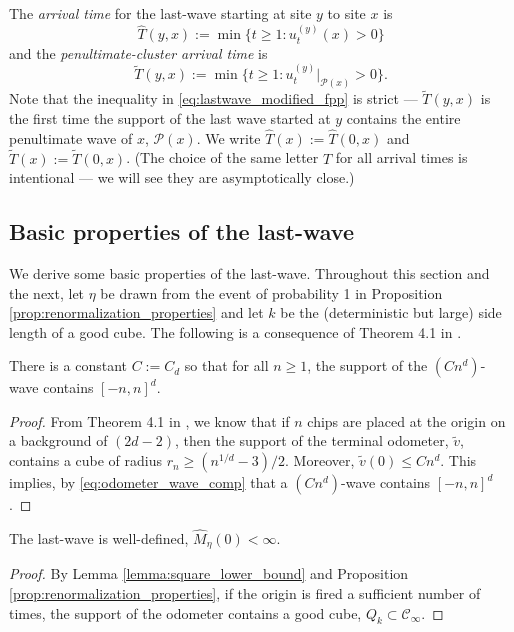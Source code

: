 \documentclass[12pt]{amsart}
\begin{document}
The {\it arrival time} for the last-wave starting at site $y$ to site $x$ is
\begin{equation} \label{eq:lastwave_fpp}
\hat{T}(y,x) := \min\{ t \geq 1 : u_{t}^{(y)}(x) > 0\}
\end{equation}
and the {\it penultimate-cluster arrival time} is 
\begin{equation} \label{eq:lastwave_modified_fpp}
\tilde{T}(y,x) := \min\{ t \geq 1 : u_{t}^{(y)}|_{\mathcal{P}(x)} > 0\}. 
\end{equation}
Note that the inequality in \eqref{eq:lastwave_modified_fpp} is strict --- $\tilde{T}(y,x)$ is the first time
the support of the last wave started at $y$ contains the entire penultimate wave of $x$, $\mathcal{P}(x)$. 
We write $\hat{T}(x) := \hat{T}(0,x)$ and $\tilde{T}(x) := \tilde{T}(0,x)$.
(The choice of the same letter $T$ for all arrival times is intentional --- we will see they are asymptotically close.)

\subsection{Basic properties of the last-wave} \label{sec:last_wave_basic_properties}
We derive some basic properties of the last-wave. Throughout this section and the next, let $\eta$ be drawn from the event of probability
1 in Proposition \ref{prop:renormalization_properties} and let $k$ be the (deterministic but large) side length of a good cube.  The following is a consequence of Theorem 4.1 in \cite{fey2008limiting}.
\begin{lemma} \label{lemma:square_lower_bound}
	There is a constant $C := C_d$ so that for all $n \geq 1$, the support of the $(C n^d)$-wave contains $[-n,n]^d$. 
\end{lemma}
\begin{proof}
	From Theorem 4.1 in \cite{fey2008limiting}, we know that if $n$ chips are placed at the origin 
	on a background of $(2d - 2)$, then the support of the terminal odometer, $\tilde{v}$, contains a cube of radius 
	$r_n \geq (n^{1/d}-3)/2$. Moreover, $\tilde{v}(0) \leq C n^d$. This implies, by \eqref{eq:odometer_wave_comp} that a $(C n^d)$-wave contains $[-n,n]^d$.
\end{proof}





\begin{lemma} \label{lemma:finite_exploding}
	The last-wave is well-defined, $\hat{M}_{\eta}(0) < \infty$.
\end{lemma}
\begin{proof}
	By Lemma \ref{lemma:square_lower_bound}
	and Proposition \ref{prop:renormalization_properties}, if the origin is fired a sufficient number of times, the support of the odometer contains a good cube, $Q_k \subset \mathcal{C}_{\infty}$.
\end{proof}
\end{document}
